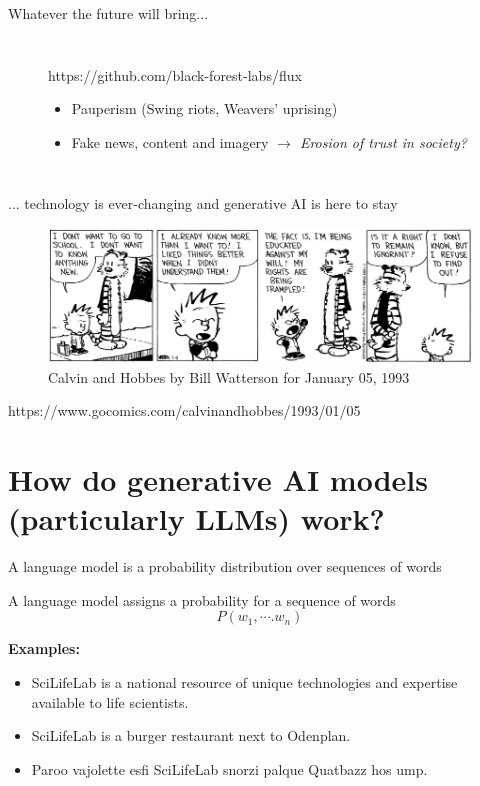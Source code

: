 \documentclass[10pt]{beamer}
\newcommand{\credit}[1]{{\par \raggedleft \scriptsize \mdseries \color{mDarkBrown} #1 \par}}
\newcommand{\creditdark}[1]{{\par \raggedleft \scriptsize \mdseries \color{scMGray} #1 \par}}
\begin{document}
\begin{frame}[standout]{Whatever the future will bring...}
\begin{columns}[T,onlytextwidth]
\begin{figure}
			\creditdark{https://github.com/black-forest-labs/flux}
				\begin{itemize}
				\item Pauperism (Swing riots, Weavers' uprising)
				\item Fake news, content and imagery\vspace{0.5cm} \linebreak 
						\emph{$\rightarrow$ Erosion of trust in society?}
			\end{itemize}
		\end{figure}
	\end{columns}
\end{frame}


\begin{frame}{... technology is ever-changing and generative AI is here to stay}
\begin{figure}
	\includegraphics[width=\textwidth]{figures/IgnorantCalvin.jpg}
	\caption{Calvin and Hobbes by Bill Watterson for January 05, 1993}
\end{figure}
\credit{https://www.gocomics.com/calvinandhobbes/1993/01/05}
\end{frame}


 \section{How do generative AI models (particularly LLMs) work?}



\begin{frame}{A language model is a probability distribution over sequences of words}
		\begin{exampleblock}{A language model}
			assigns a probability for a sequence of words
			$$
			P(w_1, \cdots. w_{n})
			$$
		\end{exampleblock}
		\textbf{Examples:}
			\begin{itemize}
				\item SciLifeLab is a national resource of unique technologies and expertise available to life scientists.
				\item SciLifeLab is a burger restaurant next to Odenplan.
				\item Paroo vajolette esfi SciLifeLab snorzi palque Quatbazz hos ump.
			\end{itemize}
\end{frame}
\end{document}
